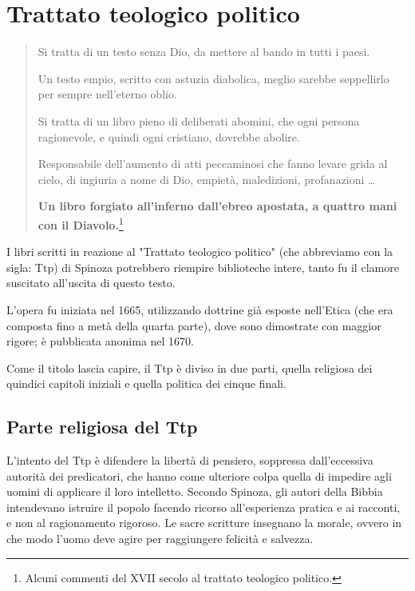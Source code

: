 \chapter{Trattato teologico politico}

\bigskip
\bigskip

\begin{quotation}
	\small Si tratta di un testo senza Dio, da mettere al bando in tutti i paesi.
	
	Un testo empio, scritto con astuzia diabolica, meglio sarebbe seppellirlo per sempre nell'eterno oblio.
	
	Si tratta di un libro pieno di deliberati abomini, che ogni persona ragionevole, e quindi ogni cristiano, dovrebbe abolire.
	
	Responsabile dell'aumento di atti peccaminosi che fanno levare grida al cielo, di ingiuria a nome di Dio, empietà, maledizioni, profanazioni \dots
	
	\textbf{Un libro forgiato all'inferno dall'ebreo apostata, a quattro mani con il Diavolo.}\footnote{Alcuni commenti del XVII secolo al trattato teologico politico.}
		
\end{quotation}

I libri scritti in reazione al "Trattato teologico politico" (che abbreviamo con la sigla: Ttp) di Spinoza potrebbero riempire biblioteche intere, tanto fu il clamore suscitato all'uscita di questo testo.

L'opera fu iniziata nel 1665, utilizzando dottrine già esposte nell'Etica (che era composta fino a metà della quarta parte), dove sono dimostrate con maggior rigore; è pubblicata anonima nel 1670. 

Come il titolo lascia capire, il Ttp è diviso in due parti, quella religiosa dei quindici capitoli iniziali e quella politica dei cinque finali.

\section[Parte religiosa]{Parte religiosa del Ttp}

L'intento del Ttp è difendere la libertà di pensiero, soppressa dall'eccessiva autorità dei predicatori, che hanno come ulteriore colpa quella di impedire agli uomini di applicare il loro intelletto. Secondo Spinoza, gli autori della Bibbia intendevano istruire il popolo facendo ricorso all'esperienza pratica e ai racconti, e non al ragionamento rigoroso. Le sacre scritture insegnano la morale, ovvero in che modo l'uomo deve agire per raggiungere felicità e salvezza. 

